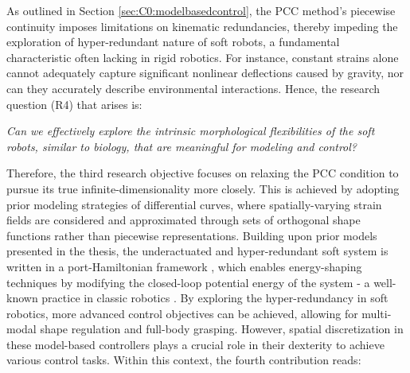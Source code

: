 As outlined in Section \ref{sec:C0:modelbasedcontrol}, the PCC method's piecewise continuity imposes limitations on kinematic redundancies, thereby impeding the exploration of hyper-redundant nature of soft robots, a fundamental characteristic often lacking in rigid robotics. For instance, constant strains alone cannot adequately capture significant nonlinear deflections caused by gravity, nor can they accurately describe environmental interactions. Hence, the research question (R4) that arises is:
%
\begin{center}
\textit{Can we effectively explore the intrinsic morphological flexibilities of the soft robots, similar to biology, that are meaningful for modeling and control?}
\end{center}
%
Therefore, the third research objective focuses on relaxing the PCC condition to pursue its true infinite-dimensionality more closely. This is achieved by adopting prior modeling strategies of differential curves, where spatially-varying strain fields are considered and approximated through sets of orthogonal shape functions rather than piecewise representations. Building upon prior models presented in the thesis, the underactuated and hyper-redundant soft system is written in a port-Hamiltonian framework \cite{Schaft2004,Ortega2002}, which enables energy-shaping techniques by modifying the closed-loop potential energy of the system - a well-known practice in classic robotics \cite{Schaft2004,Ortega1998,Ortega2002}. By exploring the hyper-redundancy in soft robotics, more advanced control objectives can be achieved, allowing for multi-modal shape regulation and full-body grasping. However, spatial discretization in these model-based controllers plays a crucial role in their dexterity to achieve various control tasks. Within this context, the fourth contribution reads:

